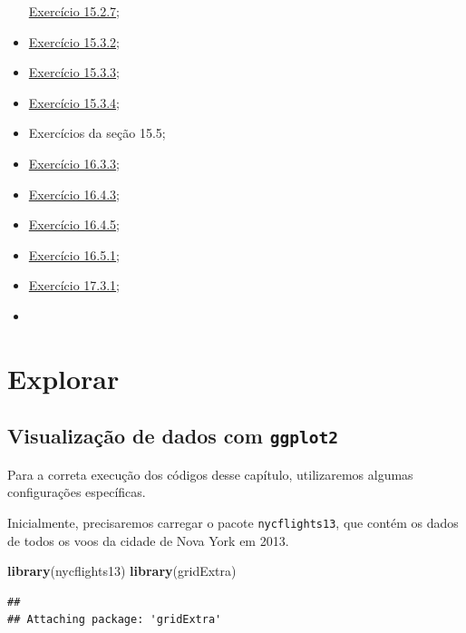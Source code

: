 \documentclass[
]{latex/krantz}
\newenvironment{Shaded}{\begin{snugshade}}{\end{snugshade}}
\newcommand{\FunctionTok}[1]{\textcolor[rgb]{0.13,0.29,0.53}{\textbf{#1}}}
\newcommand{\NormalTok}[1]{#1}
\theoremstyle{definition}
\theoremstyle{definition}
\theoremstyle{definition}
\theoremstyle{definition}
\theoremstyle{remark}
\begin{document}
\begin{itemize}
  \protect\hyperlink{exr15-2-7}{Exercício 15.2.7};
\item
  \protect\hyperlink{exr15-3-2}{Exercício 15.3.2};
\item
  \protect\hyperlink{exr15-3-3}{Exercício 15.3.3};
\item
  \protect\hyperlink{exr15-3-4}{Exercício 15.3.4};
\item
  Exercícios da seção 15.5;
\item
  \protect\hyperlink{exr16-3-3}{Exercício 16.3.3};
\item
  \protect\hyperlink{exr16-4-3}{Exercício 16.4.3};
\item
  \protect\hyperlink{exr16-4-5}{Exercício 16.4.5};
\item
  \protect\hyperlink{exr16-5-1}{Exercício 16.5.1};
\item
  \protect\hyperlink{exr17-3-1}{Exercício 17.3.1};
\item
\end{itemize}

\mainmatter

\hypertarget{part-explorar}{%
\part{Explorar}\label{part-explorar}}

\hypertarget{visualizauxe7uxe3o-de-dados-com-ggplot2}{%
\chapter{\texorpdfstring{Visualização de dados com \texttt{ggplot2}}{Visualização de dados com ggplot2}}\label{visualizauxe7uxe3o-de-dados-com-ggplot2}}

Para a correta execução dos códigos desse capítulo, utilizaremos algumas configurações específicas.

Inicialmente, precisaremos carregar o pacote \texttt{nycflights13}, que contém os dados de todos os voos da cidade de Nova York em 2013.

\begin{Shaded}
\begin{Highlighting}[]
\FunctionTok{library}\NormalTok{(nycflights13)}
\FunctionTok{library}\NormalTok{(gridExtra)}
\end{Highlighting}
\end{Shaded}

\begin{verbatim}
## 
## Attaching package: 'gridExtra'
\end{verbatim}
\end{document}
